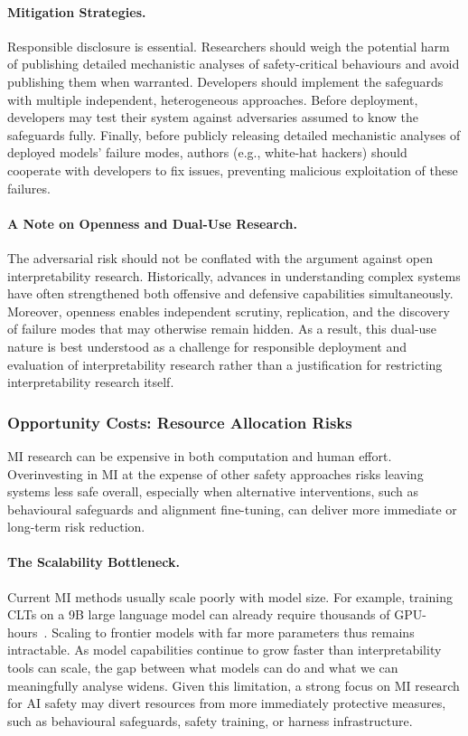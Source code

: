\paragraph{Mitigation Strategies.}
Responsible disclosure is essential. Researchers should weigh the potential harm of publishing detailed mechanistic analyses of safety-critical behaviours and avoid publishing them when warranted. Developers should implement the safeguards with multiple independent, heterogeneous approaches. Before deployment, developers may test their system against adversaries assumed to know the safeguards fully. Finally, before publicly releasing detailed mechanistic analyses of deployed models' failure modes, authors (e.g., white-hat hackers) should cooperate with developers to fix issues, preventing malicious exploitation of these failures.

\paragraph{A Note on Openness and Dual-Use Research.}
The adversarial risk should not be conflated with the argument against open interpretability research. Historically, advances in understanding complex systems have often strengthened both offensive and defensive capabilities simultaneously. Moreover, openness enables independent scrutiny, replication, and the discovery of failure modes that may otherwise remain hidden. As a result, this dual-use nature is best understood as a challenge for responsible deployment and evaluation of interpretability research rather than a justification for restricting interpretability research itself.


\subsubsection{Opportunity Costs: Resource Allocation Risks}

MI research can be expensive in both computation and human effort. Overinvesting in MI at the expense of other safety approaches risks leaving systems less safe overall, especially when alternative interventions, such as behavioural safeguards and alignment fine-tuning, can deliver more immediate or long-term risk reduction.

\paragraph{The Scalability Bottleneck.}
Current MI methods usually scale poorly with model size. For example, training CLTs on a 9B large language model can already require thousands of GPU-hours~. Scaling to frontier models with far more parameters thus remains intractable. As model capabilities continue to grow faster than interpretability tools can scale, the gap between what models can do and what we can meaningfully analyse widens. Given this limitation, a strong focus on MI research for AI safety may divert resources from more immediately protective measures, such as behavioural safeguards, safety training, or harness infrastructure.


